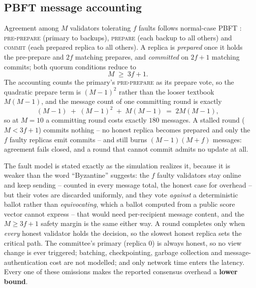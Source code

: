 \documentclass[review,12pt]{elsarticle}
\begin{document}
\subsection{PBFT message accounting}
\label{sec:sup-pbft}

Agreement among $M$ validators tolerating $f$ faults follows normal-case
PBFT \cite{castro1999}: \textsc{pre-prepare} (primary to backups),
\textsc{prepare} (each backup to all others) and \textsc{commit} (each
prepared replica to all others). A replica is \emph{prepared} once it
holds the pre-prepare and $2f$ matching prepares, and \emph{committed} on
$2f+1$ matching commits; both quorum conditions reduce to
\begin{equation}
M \;\ge\; 3f+1 .
\label{eq:pbftbound}
\end{equation}
The accounting counts the primary's \textsc{pre-prepare} as its prepare
vote, so the quadratic prepare term is $(M-1)^2$ rather than the looser
textbook $M(M-1)$, and the message count of one committing round is
exactly
\begin{equation}
(M-1) \;+\; (M-1)^2 \;+\; M(M-1) \;=\; 2M(M-1),
\label{eq:pbftmsgs}
\end{equation}
so at $M=10$ a committing round costs exactly $180$ messages. A stalled
round ($M < 3f+1$) commits nothing -- no honest replica becomes prepared
and only the $f$ faulty replicas emit commits -- and still burns
$(M-1)(M+f)$ messages: agreement fails closed, and a round that cannot
commit admits no update at all.

The fault model is stated exactly as the simulation realizes it, because
it is weaker than the word ``Byzantine'' suggests: the $f$ faulty
validators stay online and keep sending -- counted in every message
total, the honest case for overhead -- but their votes are discarded
uniformly, and they vote \emph{against} a deterministic ballot rather
than \emph{equivocating}, which a ballot computed from a public score
vector cannot express -- that would need per-recipient message content,
and the $M \ge 3f+1$ safety margin is the same either way. A round
completes only when \emph{every} honest validator holds the decision, so
the slowest honest replica sets the critical path. The committee's
primary (replica $0$) is always honest, so no view change is ever
triggered; batching, checkpointing, garbage collection and
message-authentication cost are not modelled; and only network time
enters the latency. Every one of these omissions makes the reported
consensus overhead a \textbf{lower bound}.
\end{document}

